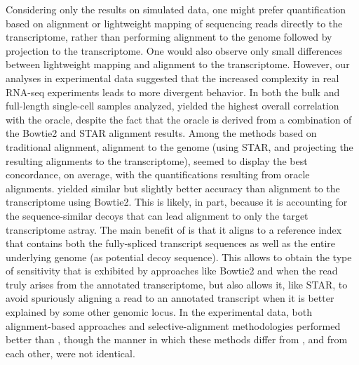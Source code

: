 Considering only the results on simulated data, one
  might prefer quantification based on alignment or lightweight mapping of
  sequencing reads directly to the transcriptome, rather than performing
  alignment to the genome followed by projection to the transcriptome. One
  would also observe only small differences between lightweight mapping and
  alignment to the transcriptome. However, our analyses in experimental
  data suggested that the increased complexity in real RNA-seq experiments
  leads to more divergent behavior.  In both the bulk and full-length single-cell samples analyzed, \saf yielded
  the highest overall correlation with the oracle, despite the fact that the oracle 
  is derived from a combination of the Bowtie2 and STAR alignment results. 
  Among the methods based on traditional
  alignment, alignment to the genome (using STAR, and projecting the
  resulting alignments to the transcriptome), seemed to display the best
  concordance, on average, with the quantifications resulting from oracle
  alignments. \hsa yielded similar but slightly better accuracy than alignment
  to the transcriptome using Bowtie2.  This is likely, in part, because it is accounting for the 
  sequence-similar decoys that can lead alignment to only the target transcriptome 
  astray. The main benefit of \saf is that it aligns to a reference index that contains both the fully-spliced
  transcript sequences as well as the entire underlying genome (as potential decoy sequence).
  This allows \saf to obtain the type of sensitivity that is exhibited by approaches like 
  Bowtie2 and \hsa when the read truly arises from the annotated
  transcriptome, but also allows it, like STAR, to avoid spuriously aligning
  a read to an annotated transcript when it is better explained by some other
  genomic locus. In the experimental data, both alignment-based approaches
  and selective-alignment methodologies performed better than
  \qm, though the manner in which these methods differ from \qm, and from 
  each other, were not identical.

